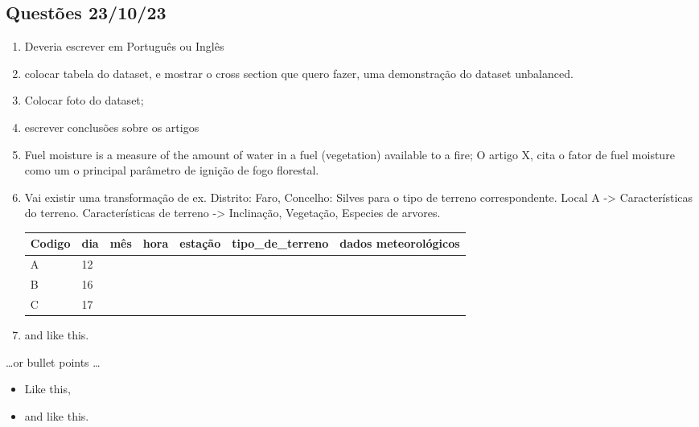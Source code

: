 \documentclass{article}
\begin{document}
\subsection{Questões 23/10/23}
\begin{enumerate}
\item Deveria escrever em Português ou Inglês
\item colocar tabela do dataset, e mostrar o cross section que quero fazer, uma demonstração do dataset unbalanced.
\item Colocar foto do dataset;
\item escrever conclusões sobre os artigos
\item Fuel moisture is a measure of the amount of water in a fuel (vegetation) available to a fire; O artigo X, cita o fator de fuel moisture como um o principal parâmetro de ignição de fogo florestal. 
\item Vai existir uma transformação de ex. Distrito: Faro, Concelho: Silves para o tipo de terreno correspondente. Local A -> Características do terreno.
Características de terreno -> Inclinação, Vegetação, Especies de arvores.


\begin{center}
\begin{table}[]
\begin{tabular}{|l|l|l|l|l|l|l|}
\hline
\cellcolor[HTML]{FFCCC9}Codigo & \cellcolor[HTML]{FFCE93}dia & \cellcolor[HTML]{FFFC9E}mês & \cellcolor[HTML]{9AFF99}hora & \cellcolor[HTML]{96FFFB}estação & \cellcolor[HTML]{ECF4FF}tipo\_de\_terreno & \cellcolor[HTML]{CBCEFB}dados meteorológicos \\ \hline
A                              & 12                          &                             &                              &                                 &                                           &                                              \\ \hline
B                              & 16                          &                             &                              &                                 &                                           &                                              \\ \hline
C                              & 17                          &                             &                              &                                 &                                           &                                              \\ \hline
\end{tabular}
\end{table}
\end{center}

\item and like this.
\end{enumerate}
\dots or bullet points \dots
\begin{itemize}
\item Like this,
\item and like this.
\end{itemize}
\end{document}

